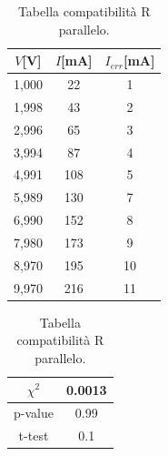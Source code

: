 \documentclass[letterpaper,12pt]{article}
\begin{document}
\begin{table}[htbp]
\begin{subtable}{0.5\textwidth}
    \centering
    \begin{tabular}{ccc}
        \toprule
        \rowcolor{blue!10}
    \textbf{$V$[V]}  & \textbf{$I$[mA]}   & \textbf{$I_{err}$[mA]} \\
        \midrule
        1,000 & 22    & 1        \\
        1,998 & 43    & 2        \\
        2,996 & 65    & 3        \\
        3,994 & 87    & 4        \\
        4,991 & 108   & 5        \\
        5,989 & 130   & 7        \\
        6,990 & 152   & 8        \\
        7,980 & 173   & 9        \\
        8,970 & 195   & 10       \\
        9,970 & 216   & 11       \\
        \bottomrule
    \end{tabular}
    \caption{Misure resistenze in parallelo}
    \label{subtab:Misure_ohm_R_parallelo}
\end{subtable}
\begin{subtable}{0.5\textwidth}
    \centering
    \begin{tabular}{c|c}
    \hline
    \cellcolor{blue!10}$\chi^2$ & 0.0013 \\ \hline
    \cellcolor{blue!10}p-value & 0.99 \\ \hline
    \cellcolor{blue!10}t-test & 0.1 \\ \hline
\end{tabular}
\caption{Tabella compatibilità R parallelo.}
\label{subtab:Tab_compatib_ohm_parallelo}
\notag
\end{subtable}
\end{table}
\end{document}
